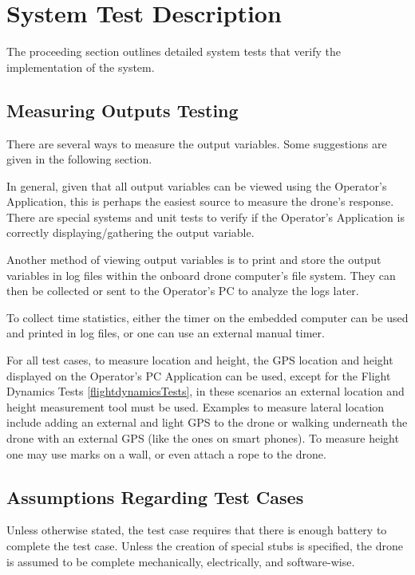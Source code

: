 \documentclass[12pt, titlepage]{article}
\begin{document}
\section{System Test Description}
\label{systemTest}
The proceeding section outlines detailed system tests that verify the implementation of the system.

\subsection{Measuring Outputs Testing}

There are several ways to measure the output variables. Some suggestions are given in the following section. 

In general, given that all output variables can be viewed using the Operator's Application, this is perhaps the easiest source to measure the drone's response. There are special systems and unit tests to verify if the Operator's Application is correctly displaying/gathering the output variable.

Another method of viewing output variables is to print and store the output variables in log files within the onboard drone computer's file system. They can then be collected or sent to the Operator's PC to analyze the logs later.

To collect time statistics, either the timer on the embedded computer can be used and printed in log files, or one can use an external manual timer.

For all test cases, to measure location and height, the GPS location and height displayed on the Operator's PC Application can be used, except for the Flight Dynamics Tests \ref{flightdynamicsTests}, in these scenarios an external location and height measurement tool must be used. Examples to measure lateral location include adding an external and light GPS to the drone or walking underneath the drone with an external GPS (like the ones on smart phones). To measure height one may use marks on a wall, or even attach a rope to the drone.

\subsection{Assumptions Regarding Test Cases}
Unless otherwise stated, the test case requires that there is enough battery to complete the test case.
Unless the creation of special stubs is specified, the drone is assumed to be complete mechanically, electrically, and software-wise. 
\end{document}
